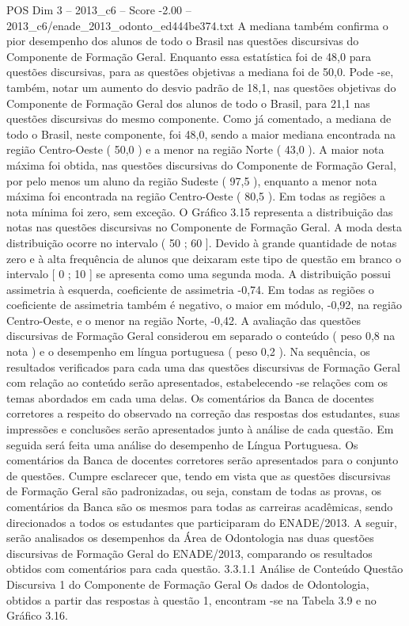 \begin{textsample}{POS Dim 3 – 2013\_c6 – Score -2.00 – 2013\_c6/enade\_2013\_odonto\_ed444be374.txt}
A mediana também confirma o pior desempenho dos alunos de todo o Brasil nas questões discursivas do Componente de Formação Geral.
Enquanto essa estatística foi de 48,0 para questões discursivas, para as questões objetivas a mediana foi de 50,0.
Pode -se, também, notar um aumento do desvio padrão de 18,1, nas questões objetivas do Componente de Formação Geral dos alunos de todo o Brasil, para 21,1 nas questões discursivas do mesmo componente.
Como já comentado, a mediana de todo o Brasil, neste componente, foi 48,0, sendo a maior mediana encontrada na região Centro-Oeste ( 50,0 ) e a menor na região Norte ( 43,0 ).
A maior nota máxima foi obtida, nas questões discursivas do Componente de Formação Geral, por pelo menos um aluno da região Sudeste ( 97,5 ), enquanto a menor nota máxima foi encontrada na região Centro-Oeste ( 80,5 ).
Em todas as regiões a nota mínima foi zero, sem exceção.
O Gráfico 3.15 representa a distribuição das notas nas questões discursivas no Componente de Formação Geral.
A moda desta distribuição ocorre no intervalo ( 50 ; 60 ].
Devido à grande quantidade de notas zero e à alta frequência de alunos que deixaram este tipo de questão em branco o intervalo [ 0 ; 10 ] se apresenta como uma segunda moda.
A distribuição possui assimetria à esquerda, coeficiente de assimetria -0,74.
Em todas as regiões o coeficiente de assimetria também é negativo, o maior em módulo, -0,92, na região Centro-Oeste, e o menor na região Norte, -0,42.
A avaliação das questões discursivas de Formação Geral considerou em separado o conteúdo ( peso 0,8 na nota ) e o desempenho em língua portuguesa ( peso 0,2 ).
Na sequência, os resultados verificados para cada uma das questões discursivas de Formação Geral com relação ao conteúdo serão apresentados, estabelecendo -se relações com os temas abordados em cada uma delas.
Os comentários da Banca de docentes corretores a respeito do observado na correção das respostas dos estudantes, suas impressões e conclusões serão apresentados junto à análise de cada questão.
Em seguida será feita uma análise do desempenho de Língua Portuguesa.
Os comentários da Banca de docentes corretores serão apresentados para o conjunto de questões.
Cumpre esclarecer que, tendo em vista que as questões discursivas de Formação Geral são padronizadas, ou seja, constam de todas as provas, os comentários da Banca são os mesmos para todas as carreiras acadêmicas, sendo direcionados a todos os estudantes que participaram do ENADE/2013.
A seguir, serão analisados os desempenhos da Área de Odontologia nas duas questões discursivas de Formação Geral do ENADE/2013, comparando os resultados obtidos com comentários para cada questão. 3.3.1.1 Análise de Conteúdo Questão Discursiva 1 do Componente de Formação Geral Os dados de Odontologia, obtidos a partir das respostas à questão 1, encontram -se na Tabela 3.9 e no Gráfico 3.16.

\end{textsample}

